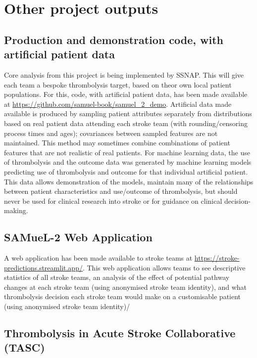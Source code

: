 \section{Other project outputs}

\subsection{Production and demonstration code, with artificial patient data}

Core analysis from this project is being implemented by SSNAP. This will give each team a bespoke thrombolysis target, based on theor own local patient populations. For this, code, with artificial patient data, has been made available at \url{https://github.com/samuel-book/samuel_2_demo}. Artificial data made available is produced by sampling patient attributes separately from distributions based on real patient data attending each stroke team (with rounding/censoring process times and ages); covariances between sampled features are not maintained. This method may sometimes combine combinations of patient features that are not realistic of real patients. For machine learning data, the use of thrombolysis and the outcome data was generated by machine learning models predicting use of thrombolysis and outcome for that individual artificial patient. This data allows demonstration of the models, maintain many of the relationships between patient characteristics and use/outcome of thrombolysis, but should never be used for clinical research into stroke or for guidance on clinical decision-making.

\subsection{SAMueL-2 Web Application}

A web application has been made available to stroke teams at \url{https://stroke-predictions.streamlit.app/}. This web application allows teams to see descriptive statistics of all stroke teams, an analysis of the effect of potential pathway changes at each stroke team (using anonymised stroke team identity), and what thrombolysis decision each stroke team would make on a customisable patient (using anonymised stroke team identity)/

\subsection{Thrombolysis in Acute Stroke Collaborative (TASC)}

